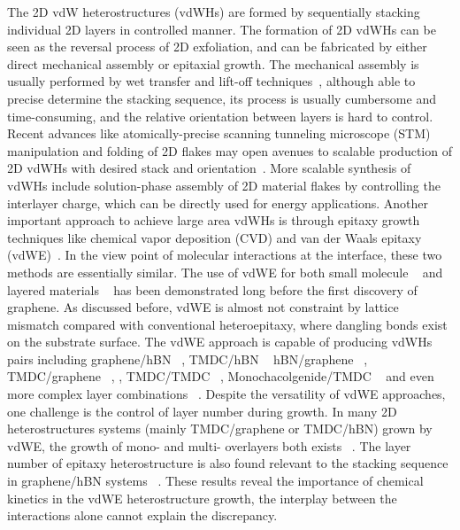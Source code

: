The 2D vdW heterostructures (vdWHs) are formed by
sequentially stacking individual 2D layers in controlled manner. The
formation of 2D vdWHs can be seen as the reversal process of 2D
exfoliation, and can be fabricated by either direct mechanical
assembly or epitaxial growth.
%
The mechanical assembly is usually performed by wet transfer and
lift-off techniques~\autocite{Novoselov_2016_vdW},
although able to precise determine the stacking
sequence, its process is usually cumbersome and time-consuming, and
the relative orientation between layers is hard to
control.
Recent advances like atomically-precise scanning tunneling microscope
(STM) manipulation and folding of 2D flakes may open avenues to
scalable production of 2D vdWHs with desired stack and
orientation~\autocite{Chen_2019_STM_graphene}.
%
More scalable synthesis of vdWHs include solution-phase assembly of 2D
material flakes by controlling the interlayer charge, which can be
directly used for energy applications.
%
Another important approach to achieve large area vdWHs is through
epitaxy growth techniques like chemical vapor deposition (CVD) and van
der Waals epitaxy (vdWE)~\autocite{Novoselov_2016_vdW}. In the view point
of molecular interactions at the interface, these two methods are
essentially similar. The use of vdWE for both small molecule
~\autocite{Hara_1989_ME,Sakurai_1991_c60_mos2} and layered materials
~\autocite{Koma_1985_vdWE,Ueno_1990_vdWE,Ohuchi_1990_MoSe2_SnS2,Parkinson_1991_vdWE}
has been demonstrated long before the first discovery of graphene. As
discussed before, vdWE is almost not constraint by lattice mismatch
compared with conventional heteroepitaxy, where dangling bonds exist
on the substrate surface.
%
The vdWE approach is capable of producing vdWHs pairs including
graphene/hBN ~\autocite{Yang_2013_gr_hBN}, TMDC/hBN
~\autocite{Yan_2015_MoS2_on_hBN,Wang_2015_cvd_MoS2_BN,
  Cattelan_2015_Ws2_hBN} hBN/graphene ~\autocite{Lin_2014_vdW_solid},
TMDC/graphene
~\autocite{Shi_2012_vdw_epi_MoS2_gr,McCreary_2014_MoS2_gr,Azizi_2015_Freevdw_Gr_TMDCs,Miwa_2015_MoS2_gr,Ago_2015_MoS2_Gr,Lin_2014_WS2_Gr,Lin_2015_Wse2_MoS2_gr},
, TMDC/TMDC ~\autocite{Diaz_2015_MoTe2_MoSe2,Gong_2014_WS2_MoS2},
Monochacolgenide/TMDC
~\autocite{Li_2016_GaSe_MoSe2_vdW,Zhang_2014_vdw_epi_SnS2_MoS2} and even
more complex layer combinations
~\autocite{Lin_2015_Wse2_MoS2_gr,Alemayehu_2015_TMDC_vdw}.
% 
Despite the versatility of vdWE approaches, one challenge is the
control of layer number  during growth.
%
In many 2D heterostructures systems (mainly TMDC/graphene or TMDC/hBN)
grown by vdWE, the growth of mono- and multi- overlayers both exists
~\autocite{Shi_2012_vdw_epi_MoS2_gr,Azizi_2015_Freevdw_Gr_TMDCs,Miwa_2015_MoS2_gr,Yan_2015_MoS2_on_hBN}.
%
The layer number of epitaxy heterostructure is
also found relevant to the stacking sequence in graphene/hBN systems ~\autocite{Wu_2015_Gr_hBN,Yang_2013_gr_hBN,Wu_2015_Gr_hBN}.
%
These results reveal the
importance of chemical kinetics in the vdWE heterostructure growth,
the interplay between the interactions alone cannot explain the
discrepancy.

